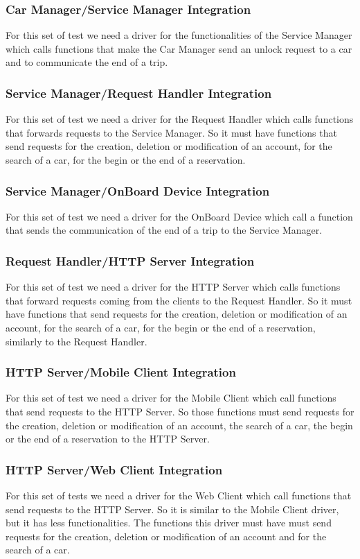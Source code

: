 \subsubsection{Car Manager/Service Manager Integration}
For this set of test we need a driver for the functionalities of the Service Manager which calls functions that make the Car Manager send an unlock request to a car and to communicate the end of a trip.
\subsubsection{Service Manager/Request Handler Integration}
For this set of test we need a driver for the Request Handler which calls functions that forwards requests to the Service Manager. So it must have functions that send requests for the creation, deletion or modification of an account, for the search of a car, for the begin or the end of a reservation.
\subsubsection{Service Manager/OnBoard Device Integration}
For this set of test we need a driver for the OnBoard Device which call a function that sends the communication of the end of a trip to the Service Manager.
\subsubsection{Request Handler/HTTP Server Integration}
For this set of test we need a driver for the HTTP Server which calls functions that forward requests coming from the clients to the Request Handler. So it must have functions that send requests for the creation, deletion or modification of an account, for the search of a car, for the begin or the end of a reservation, similarly to the Request Handler.
\subsubsection{HTTP Server/Mobile Client Integration}
For this set of test we need a driver for the Mobile Client which call functions that send requests to the HTTP Server. So those functions must send requests for the creation, deletion or modification of an account, the search of a car, the begin or the end of a reservation to the HTTP Server.
\subsubsection{HTTP Server/Web Client Integration}
For this set of tests we need a driver for the Web Client which call functions that send requests to the HTTP Server. So it is similar to the Mobile Client driver, but it has less functionalities. The functions this driver must have must send  requests for the creation, deletion or modification of an account and for the search of a car.

